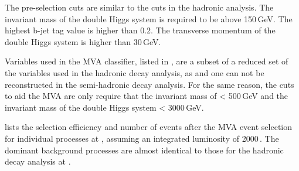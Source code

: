 The pre-selection cuts are similar to the cuts in the hadronic analysis. The invariant mass of the double Higgs system is required to be above 150\,GeV. The highest b-jet tag value is higher than 0.2. The transverse momentum of the double Higgs system is higher than 30\,GeV.

Variables used in the MVA classifier, listed in  ,  are a subset of a reduced set of the variables  used in the hadronic decay analysis, as \HWW and one \PW can not be reconstructed in the semi-hadronic decay analysis. For the same reason, the cuts to aid the MVA are only require that the invariant mass of \Hbb < 500\,GeV and the invariant mass of the double Higgs system < 3000\,GeV.



 lists the  selection efficiency and number of events after the MVA event selection for individual processes at , assuming an integrated luminosity of 2000\,.  The dominant background processes are almost identical to those for the hadronic decay analysis  at . 

